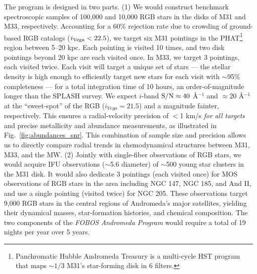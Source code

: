 \documentclass[11pt,a4paper,twoside,onecolumn,openany,final,oldfontcommands]{memoir}
\begin{document}
The program is designed in two parts. (1) We would construct benchmark spectroscopic samples of 100,000 and 10,000 RGB stars in the disks of M31 and M33, respectively.  Accounting for a 60\% rejection rate \citep{dorman12} due to crowding of ground-based RGB catalogs ($i_{\rm Vega} < 22.5$), we target six M31 pointings in the PHAT\footnote{Panchromatic Hubble Andromeda Treasury \citep{phat} is a multi-cycle HST program that maps $\sim1/3$ M31's star-forming disk in 6 filters.} region between 5--20 kpc.  Each pointing is visited 10 times, and two disk pointings beyond 20 kpc are each visited once.  In M33, we target 3 pointings, each visited twice.  Each visit will target a unique set of stars --- the stellar density is high enough to efficiently target new stars for each visit with $\sim$95\% completeness --- for a total integration time of 10 hours, an order-of-magnitude longer than the SPLASH survey.  We expect $i$-band ${\rm S/N} \approx 40$ \AA$^{-1}$ and $\approx 20$ \AA$^{-1}$ at the  ``sweet-spot'' of the RGB ($i_{Vega} = 21.5$) and a magnitude fainter, respectively.  This ensures a radial-velocity precision of $<$1 km/s \textit{ for all targets} and precise metallicity and abundance measurements, as illustrated in Fig.~\ref{fig:abundances_snr}.
This combination of sample size and precision allows us to directly compare radial trends in chemodynamical structures between M31, M33, and the MW. (2) Jointly with single-fiber observations of RGB stars, we would acquire IFU observations ($\sim$5.6\arcsec{} diameter) of $\sim$500 young star clusters in the M31 disk.  It would also dedicate 3 pointings (each visited once) for MOS observations of RGB stars in the area including NGC 147, NGC 185, and And II, and use a single pointing (visited twice) for NGC 205.  These observations target 9,000 RGB stars in the central regions of Andromeda's major satellites, yielding their dynamical masses, star-formation histories, and chemical composition.  The two components of the \textit{ FOBOS Andromeda Program} would require a total of 19 nights per year over 5 years. 



\newpage


\newpage
\end{document}
